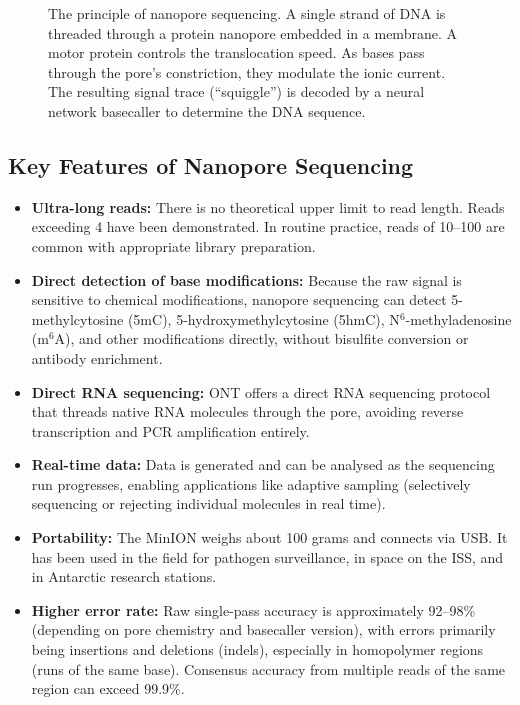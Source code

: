 \begin{figure}[htbp]
\caption[Nanopore sequencing principle.]{The principle of nanopore sequencing. A single strand of DNA is threaded through a protein nanopore embedded in a membrane. A motor protein controls the translocation speed. As bases pass through the pore's constriction, they modulate the ionic current. The resulting signal trace (``squiggle'') is decoded by a neural network basecaller to determine the DNA sequence.}
\label{fig:seqprinciples:nanopore}
\end{figure}

\subsection{Key Features of Nanopore Sequencing}
\label{subsec:seqprinciples:nanopore-features}

\begin{itemize}[itemsep=3pt]
  \item \textbf{Ultra-long reads:} There is no theoretical upper limit to read length. Reads exceeding 4\megabase{} have been demonstrated. In routine practice, reads of 10--100\kilobase{} are common with appropriate library preparation.
  \item \textbf{Direct detection of base modifications:} Because the raw signal is sensitive to chemical modifications, nanopore sequencing can detect 5-methylcytosine (5mC), 5-hydroxymethylcytosine (5hmC), N$^6$-methyladenosine (m$^6$A), and other modifications directly, without bisulfite conversion or antibody enrichment.
  \item \textbf{Direct RNA sequencing:} \acrshort{ONT} offers a direct RNA sequencing protocol that threads native RNA molecules through the pore, avoiding reverse transcription and \acrshort{PCR} amplification entirely.
  \item \textbf{Real-time data:} Data is generated and can be analysed as the sequencing run progresses, enabling applications like adaptive sampling (selectively sequencing or rejecting individual molecules in real time).
  \item \textbf{Portability:} The MinION weighs about 100 grams and connects via USB. It has been used in the field for pathogen surveillance, in space on the ISS, and in Antarctic research stations.
  \item \textbf{Higher error rate:} Raw single-pass accuracy is approximately 92--98\% (depending on pore chemistry and basecaller version), with errors primarily being insertions and deletions (indels), especially in homopolymer regions (runs of the same base). Consensus accuracy from multiple reads of the same region can exceed 99.9\%.
\end{itemize}


